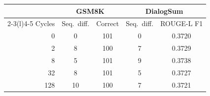 \begin{tabular}{@{}rcccc@{}}
\toprule
 & \multicolumn{2}{c}{GSM8K} & \multicolumn{2}{c}{DialogSum} \\
\cmidrule(lr){2-3}\cmidrule(l){4-5}
Cycles & Seq.\ diff. & Correct & Seq.\ diff. & ROUGE-L F1 \\
\midrule
0   & 0  & 101 & 0 & 0.3720 \\
2   & 8  & 100 & 7 & 0.3729 \\
8   & 5  & 101 & 9 & 0.3738 \\
32  & 8  & 101 & 5 & 0.3727 \\
128 & 10 & 100 & 7 & 0.3721 \\
\bottomrule
\end{tabular}
